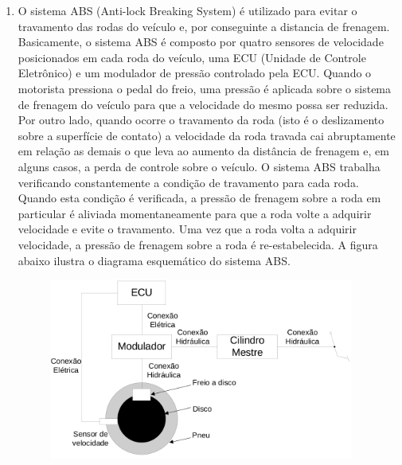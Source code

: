\documentclass[a4paper,10pt]{article}
\begin{document}
\begin{enumerate}
  \item O sistema ABS (Anti-lock Breaking System) é utilizado para evitar o travamento das rodas do veículo e, por conseguinte a distancia de 
      frenagem. Basicamente, o sistema ABS é composto por quatro sensores de velocidade posicionados em cada roda do veículo, uma ECU (Unidade 
      de Controle Eletrônico) e um modulador de pressão controlado pela ECU. Quando o motorista pressiona o pedal do freio, uma pressão é aplicada 
      sobre o sistema de frenagem do veículo para que a velocidade do mesmo possa ser reduzida. Por outro lado, quando ocorre o travamento da roda 
      (isto é o deslizamento sobre a superfície de contato) a velocidade da roda travada cai abruptamente em relação as demais o que leva ao aumento 
      da distância de frenagem e, em alguns casos, a perda de controle sobre o veículo. O sistema ABS trabalha verificando constantemente a condição 
      de travamento para cada roda. Quando esta condição é verificada, a pressão de frenagem sobre a roda em particular é aliviada momentaneamente 
      para que a roda volte a adquirir velocidade e evite o travamento. Uma vez que a roda volta a adquirir velocidade, a pressão de frenagem sobre 
      a roda é re-estabelecida. A figura abaixo ilustra o diagrama esquemático do sistema ABS.

\begin{figure}[ht]
 \center
 \includegraphics[width=10cm]{imagem/abs.png}
\end{figure}


\end{enumerate}
\end{document}
